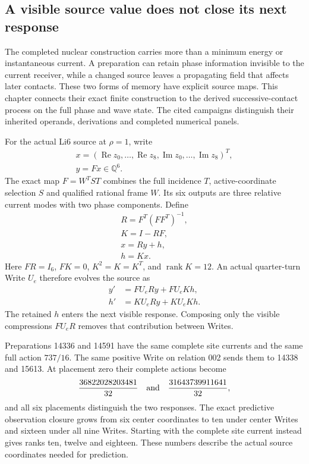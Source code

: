 \label{ch:nuclear-process}

\subsection{A visible source value does not close its next response}

The completed nuclear construction carries more than a minimum energy or
instantaneous current. A preparation can retain phase information invisible
to the current receiver, while a changed source leaves a propagating field
that affects later contacts. These two forms of memory have explicit source
maps. This chapter connects their exact finite construction to the derived
successive-contact process on the full phase and wave state. The cited
campaigns distinguish their inherited operands, derivations and completed
numerical panels.

For the actual Li6 source at \(\rho=1\), write
\[
\begin{gathered}
x=(\operatorname{Re}z_0,\ldots,\operatorname{Re}z_8,
       \operatorname{Im}z_0,\ldots,\operatorname{Im}z_8)^T,\\
 y=Fx\in\mathbb Q^6.
\end{gathered}
\]
The exact map \(F=W^TST\) combines the full incidence \(T\), active-coordinate
selection \(S\) and qualified rational frame \(W\). Its six outputs are three
relative current modes with two phase components. Define
\[
\begin{gathered}
R=F^T(FF^T)^{-1},\\
 K=I-RF,\\
 x=Ry+h,\\
 h=Kx.
\end{gathered}
\]
Here \(FR=I_6\), \(FK=0\), \(K^2=K=K^T\), and \(\operatorname{rank}K=12\).
An actual quarter-turn Write \(U_e\) therefore evolves the source as
\[
 \begin{split}
 y'&=FU_eRy+FU_eKh,\\
 h'&=KU_eRy+KU_eKh.
 \end{split}
\]
The retained \(h\) enters the next visible response. Composing only the
visible compressions \(FU_eR\) removes that contribution between Writes.

Preparations 14336 and 14591 have the same complete site currents and the
same full action \(737/16\). The same positive Write on relation 002 sends
them to 14338 and 15613. At placement zero their complete actions become
\[
 \frac{36822028203481}{32}
 \quad\hbox{and}\quad
 \frac{31643739911641}{32},
\]
and all six placements distinguish the two responses. The exact predictive
observation closure grows from six center coordinates to ten under center
Writes and sixteen under all nine Writes. Starting with the complete site
current instead gives ranks ten, twelve and eighteen. These numbers
describe the actual source coordinates needed for prediction.


